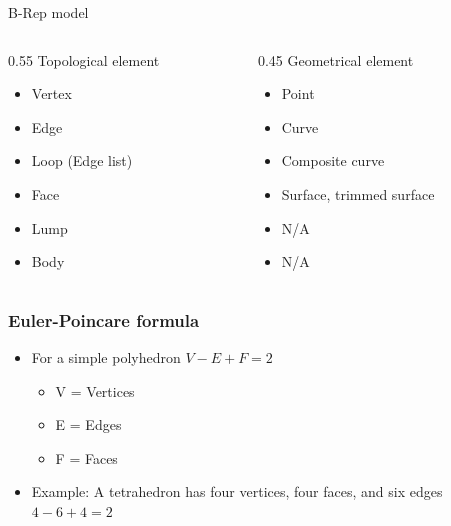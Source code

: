 \begin{frame}[fragile]{B-Rep model}
 \begin{columns}
  \begin{column}{0.55\linewidth}
	Topological element
	\begin{itemize}
	\item Vertex
	\item Edge
	\item Loop (Edge list)
	\item Face
	\item Lump
	\item Body
	\end{itemize}
	
  \end{column}%
  \begin{column}{0.45\linewidth}
	Geometrical element

	\begin{itemize}
	\item Point
	\item Curve
	\item Composite curve
	\item Surface, trimmed surface
	\item N/A
	\item N/A
	\end{itemize}
  \end{column}
 \end{columns}
\end{frame}

\begin{frame}[fragile]\frametitle{Euler-Poincare formula}
\begin{itemize}
\item For a simple polyhedron $ V - E + F = 2$
\begin{itemize}
\item V = Vertices
\item E = Edges
\item F = Faces
\end{itemize}
\item Example: A tetrahedron has four vertices, four faces, and six edges
$4-6+4=2$ \checkmark
\end{itemize}
\end{frame}


